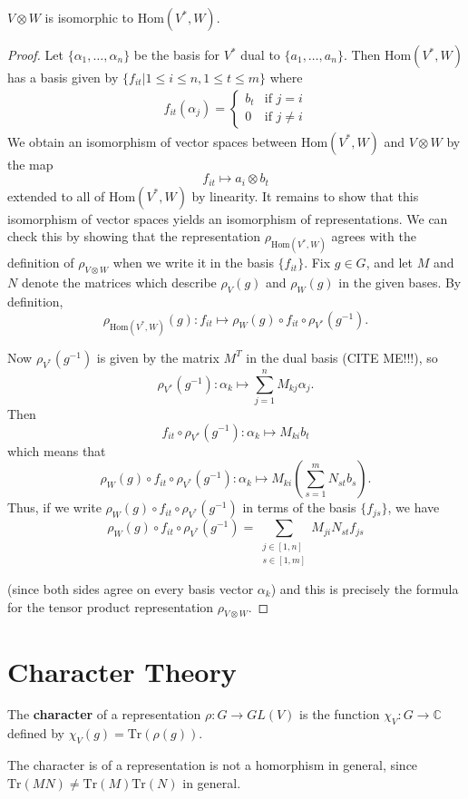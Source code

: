 \begin{prop}
$V \otimes W$ is isomorphic to $\text{Hom}(V^{*},W)$.
\end{prop}
\begin{proof}
Let $\{\alpha_1, \ldots, \alpha_n \}$ be the basis for $V^{*}$ dual to $\{ a_1,  \ldots, a_n\}$.  Then $\text{Hom}(V^*,W)$ has a basis given by $\{ f_{it} | 1 \leq i \leq n, 1 \leq t \leq m \}$ where
\begin{align*}
f_{it} (\alpha_j) = \begin{cases} b_t &\text{if } j = i\\ 0 &\text{if } j \neq i \end{cases}
\end{align*}
We obtain an isomorphism of vector spaces between $\text{Hom}(V^*,W)$ and $V \otimes W$ by the map
\[ f_{it} \mapsto a_i \otimes b_t \]
extended to all of  $\text{Hom}(V^*,W)$ by linearity.  It remains to show that this isomorphism of vector spaces yields an isomorphism of representations.  We can check this by showing that the representation $\rho_{\text{Hom}(V^*,W)}$ agrees with the definition of $\rho_{V \otimes W}$ when we write it in the basis $\{ f_{it} \}$.  Fix $g \in G$, and let $M$ and $N$ denote the matrices which describe $\rho_V (g)$ and $\rho_W (g)$ in the given bases.
By definition,
\[ \rho_{\text{Hom}(V^{*},W)} (g) \colon f_{it} \mapsto \rho_W (g) \circ f_{it} \circ \rho_{V^{*}}(g^{-1}). \]

Now $\rho_{V^{*}} (g^ {-1})$ is given by the matrix $M^T$ in the dual basis (CITE ME!!!), so
\[\rho_{V^{*}} (g^ {-1}) \colon \alpha_k \mapsto \sum_{j=1}^n M_{kj} \alpha_{j}. \]
Then
\[ f_{it} \circ \rho_{V^{*}} (g^ {-1}) \colon \alpha_k \mapsto M_{ki} b_t \]
which means that 
\[ \rho_W (g) \circ f_{it} \circ \rho_{V^{*}} (g^ {-1}) \colon \alpha_k \mapsto M_{ki} \left( \sum_{s=1}^m N_{st} b_s \right). \]
Thus, if we write $\rho_W (g) \circ f_{it} \circ \rho_{V^{*}} (g^ {-1})$ in terms of the basis $\{ f_{js} \}$, we have 
\[\rho_W (g) \circ f_{it} \circ \rho_{V^{*}} (g^ {-1}) = \sum_{\substack{j \in [1,n] \\  s \in [1,m]}} M_{ji} N_{st} f_{js} \]

(since both sides agree on every basis vector $\alpha_k$) and this is precisely the formula for the tensor product representation $\rho_{V \otimes W}$.
\end{proof}


\section{Character Theory}
\begin{defn}
The \textbf{character} of a representation $\rho \colon G \to GL(V)$ is the function $\chi_V \colon G \to \mathbb{C}$ defined by $\chi_V(g) = \text{Tr}(\rho(g))$.
\end{defn}
\begin{note}
The character is of a representation is not a homorphism in general, since $\text{Tr}(MN) \neq \text{Tr}(M) \text{Tr}(N)$ in general.
\end{note}

